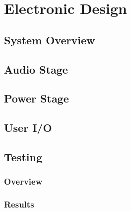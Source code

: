 \documentclass[main.tex]{subfiles}
\begin{document}
\chapter{Electronic Design}
\section{System Overview}
\section{Audio Stage}
\section{Power Stage}
\section{User I/O}
\section{Testing}
\subsection{Overview}
\subsection{Results}
\end{document}
